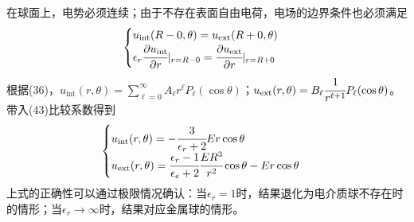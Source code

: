 \documentclass[a4paper,10pt]{ctexart}
\begin{document}
在球面上，电势必须连续；由于不存在表面自由电荷，电场的边界条件也必须满足
\begin{equation}
\begin{cases}
u_{\mathrm{int}}(R-0,\theta) = u_{\mathrm{ext}}(R+0,\theta) \\
\epsilon_r \cfrac{\partial u_{\mathrm{int}}}{\partial r}|_{r=R-0} = \cfrac{\partial u_{\mathrm{ext}}}{\partial r}|_{r=R+0}
\end{cases}
\end{equation}
根据(36)，$u_{\mathrm{int}}(r,\theta)=\sum_{\ell =0}^{\infty} A_\ell r^\ell P_\ell(\cos \theta)$；$u_{\mathrm{ext}}(r,\theta) = B_\ell \cfrac{1}{r^{\ell+1}}P_\ell(\cos \theta)$。带入(43)比较系数得到
\begin{equation}
\begin{cases}
u_{\mathrm{int}}(r,\theta) = -\cfrac{3}{\epsilon_r +2}Er\cos \theta \\
u_{\mathrm{ext}}(r,\theta) = \cfrac{\epsilon_r -1}{\epsilon_e +2} \cfrac{ER^3}{r^2} \cos\theta - Er\cos\theta
\end{cases}
\end{equation}
上式的正确性可以通过极限情况确认：当$\epsilon_r=1$时，结果退化为电介质球不存在时的情形；当$\epsilon_r \rightarrow \infty$时，结果对应金属球的情形。
\par
\end{document}
